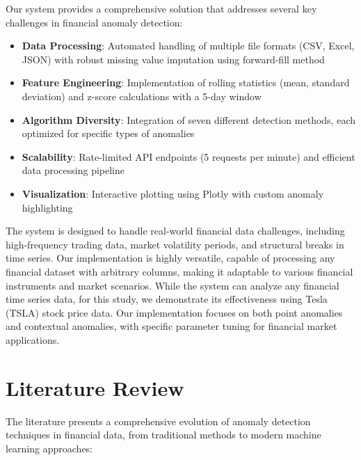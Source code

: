 \documentclass[conference]{IEEEtran}
\begin{document}
Our system provides a comprehensive solution that addresses several key challenges in financial anomaly detection:
\begin{itemize}
    \item \textbf{Data Processing}: Automated handling of multiple file formats (CSV, Excel, JSON) with robust missing value imputation using forward-fill method
    \item \textbf{Feature Engineering}: Implementation of rolling statistics (mean, standard deviation) and z-score calculations with a 5-day window
    \item \textbf{Algorithm Diversity}: Integration of seven different detection methods, each optimized for specific types of anomalies
    \item \textbf{Scalability}: Rate-limited API endpoints (5 requests per minute) and efficient data processing pipeline
    \item \textbf{Visualization}: Interactive plotting using Plotly with custom anomaly highlighting
\end{itemize}

The system is designed to handle real-world financial data challenges, including high-frequency trading data, market volatility periods, and structural breaks in time series. Our implementation is highly versatile, capable of processing any financial dataset with arbitrary columns, making it adaptable to various financial instruments and market scenarios. While the system can analyze any financial time series data, for this study, we demonstrate its effectiveness using Tesla (TSLA) stock price data. Our implementation focuses on both point anomalies and contextual anomalies, with specific parameter tuning for financial market applications.

\section{Literature Review}
The literature presents a comprehensive evolution of anomaly detection techniques in financial data, from traditional methods to modern machine learning approaches:
\end{document}
